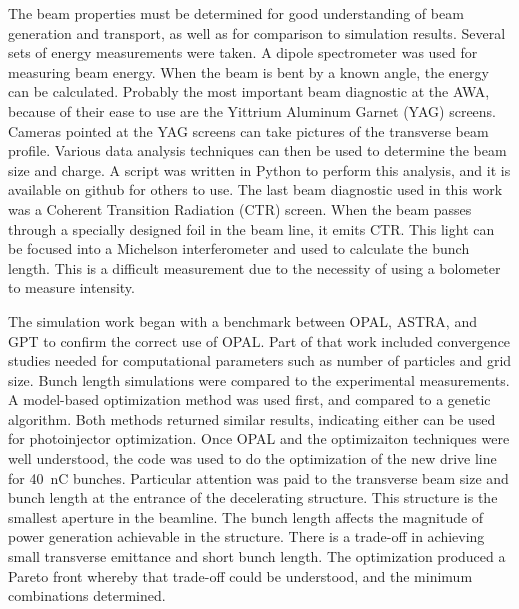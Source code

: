 The beam properties must be determined for good understanding of beam generation and transport, as well as for comparison to simulation results. Several sets of energy measurements were taken. A dipole spectrometer was used for measuring beam energy. 
When the beam is bent by a known angle, the energy can be calculated. 
Probably the most important beam diagnostic at the AWA, 
because of their ease to use are the Yittrium Aluminum Garnet (YAG) screens. 
Cameras pointed at the YAG screens can take pictures of the 
transverse beam profile. 
Various data analysis techniques can then be used to determine 
the beam size and charge. A script was written in Python
to perform this analysis, and it is available on github for others to use. 
The last beam diagnostic used in this work was a Coherent Transition Radiation (CTR) screen. When the beam passes
through a specially designed foil in the beam line, 
it emits CTR. This light can be focused into a Michelson 
interferometer and used to calculate the bunch length. 
This is a difficult measurement due to the necessity of using a 
bolometer to measure intensity. 

The simulation work began with a benchmark between OPAL, ASTRA, and GPT 
to confirm the correct use of OPAL. 
Part of that work included convergence studies needed for computational parameters such as number of particles and grid size.
Bunch length simulations were compared to the experimental 
measurements. 
A model-based optimization method was used first, 
and compared to a genetic algorithm. 
Both methods returned similar results, indicating either
can be used for photoinjector optimization.  Once OPAL and the optimizaiton techniques were well understood, the code was used to do the optimization of the new drive line for \SI{40}{nC} bunches.  Particular attention was paid to the transverse beam size and bunch length at the entrance of the decelerating structure.  This structure is the smallest aperture in the beamline.  The bunch length affects the magnitude of power generation achievable in the structure.  There is a trade-off in achieving small transverse emittance and short bunch length.  The optimization produced a Pareto front whereby that trade-off could be understood, and the minimum combinations determined.

